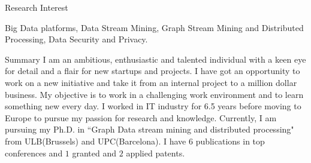 \documentclass{resume} %
\begin{document}
\begin{rSection}{Research Interest}

Big Data platforms, Data Stream Mining, Graph Stream Mining and Distributed Processing, Data Security and Privacy.

\end{rSection}
\begin{rSection}{Summary}
I am an ambitious, enthusiastic and talented individual with a keen eye for detail and a flair for new startups and projects. I have got an opportunity to work on a new initiative and take it from an internal project to a million dollar business. My objective is to work in a challenging work environment and to learn something new every day. I worked in IT industry for 6.5 years before moving to Europe to pursue my passion for research and knowledge. Currently, I am pursuing my Ph.D. in ``Graph Data stream mining and distributed processing" from ULB(Brussels) and UPC(Barcelona). I have $6$ publications in top conferences and $1$ granted and $2$ applied patents.
\end{rSection}




\end{document}

